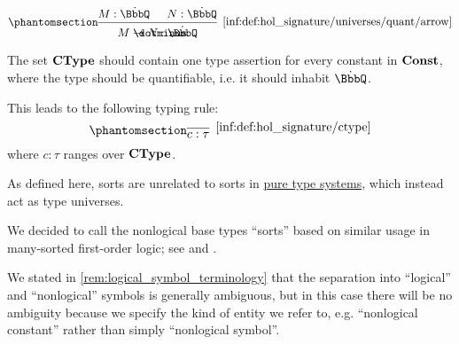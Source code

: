 \begin{definition}
\begin{thmenum}
\begin{thmenum}
\begin{paracol}{3}
        \begin{nthcolumn}{2}
          \ParacolAlignmentHack
          \begin{equation*}\taglabel[\ensuremath{ \BbbQ_\rightarrow }]{inf:def:hol_signature/universes/quant/arrow}
            \begin{prooftree}
              \hypo{ M: \syn\BbbQ }
              \hypo{ N: \syn\BbbQ }
              \infer2[\ref{inf:def:hol_signature/universes/quant/arrow}]{ M \synimplies N: \syn\BbbQ }
            \end{prooftree}
          \end{equation*}
        \end{nthcolumn}
      \end{paracol}
      \columnratio{}
    \end{thmenum}

     The set \( \op*{CType} \) should contain one type assertion for every constant in \( \op*{Const} \), where the type should be quantifiable, i.e. it should inhabit \( \syn\BbbQ \).

    This leads to the following typing rule:
    \begin{equation*}\taglabel[\logic{Const}]{inf:def:hol_signature/ctype}
      \begin{prooftree}
        \infer0[\ref{inf:def:hol_signature/ctype}]{ c: \tau },
      \end{prooftree}
    \end{equation*}
    where \( c: \tau \) ranges over \( \op*{CType} \).
  \end{thmenum}
\end{definition}
\begin{comments}
  \item As defined here, sorts are unrelated to sorts in \hyperref[def:pure_type_system]{pure type systems}, which instead act as type universes.

  We decided to call the nonlogical base types \enquote{sorts} based on similar usage in many-sorted first-order logic; see \cite[\S 4.4.13]{TroelstraSchwichtenberg2000BasicProofTheory} and \cite[def. 62]{GoguenBurstall1992Institutions}.

  \item We stated in \cref{rem:logical_symbol_terminology} that the separation into \enquote{logical} and \enquote{nonlogical} symbols is generally ambiguous, but in this case there will be no ambiguity because we specify the kind of entity we refer to, e.g. \enquote{nonlogical constant} rather than simply \enquote{nonlogical symbol}.
\end{comments}

